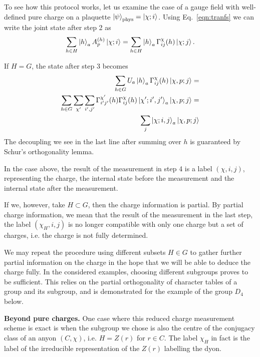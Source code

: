 \documentclass[two column]{article}
\begin{document}
To see how this protocol works, let us examine the case of a  gauge field with well-defined pure charge on a plaquette  $\ket{\psi}_\text{phys} = \ket{\chi; i}$. Using  Eq.~\eqref{eqn:tranfs} we can write the joint state after step 2 as
\begin{equation}
    \sum_{h \in H} \ket{h}_a A^{(h)}_p \ket{\chi; i} = \sum_{h \in H} \ket{h}_a \Gamma^{\chi}_{ij}(h) \ket{\chi; j}.
\end{equation}

If $H = G$, the state after step 3 becomes\begin{equation}
    \begin{split}
        \sum_{h \in G} U_a\ket{h}_a \Gamma^{\chi}_{ij}(h) \ket{\chi, p; j} = \\
        \sum_{h \in G} \sum_{\chi'}\sum_{i', j'}  \Gamma^{\chi'}_{i'j'}(h)\Gamma^{\chi}_{ij}(h) \ket{\chi'; i', j'}_a \ket{\chi, p; j} =\\
        \sum_j\ket{\chi; i, j}_a \ket{\chi, p; j}
    \end{split}
\end{equation}
The decoupling we see in the last line after summing over $h$ is guaranteed by Schur's orthogonality lemma.

In the case above, the result of the measurement in step 4 is a label $(\chi, i, j)$, representing the charge, the internal state before the measurement and the internal state after the measurement.

If we, however, take $H \subset G$, then the charge information is partial.
By partial charge information, we mean that the result of the measurement in the last step, the label $(\chi_H, i, j)$ is no longer compatible with only one charge but a set of charges, i.e. the charge is not fully determined.

We may repeat the procedure using different subsets $H \in G$ to gather further partial information on the charge in the hope that we will be able to deduce the charge fully. In the considered examples, choosing different subgroups proves to be sufficient. This relies on the partial orthogonality of character tables of a group and its subgroup, and is demonstrated for the example of the group $D_4$ below.

\textbf{Beyond pure charges.} One case where this reduced charge measurement scheme is exact is when the subgroup we chose is also the centre of the conjugacy class of an anyon $(C, \chi)$, i.e. $H = Z(r)$ for $r \in C$.
The label $\chi_H$ in fact is the label of the irreducible representation of the $Z(r)$ labelling the dyon.
\end{document}
